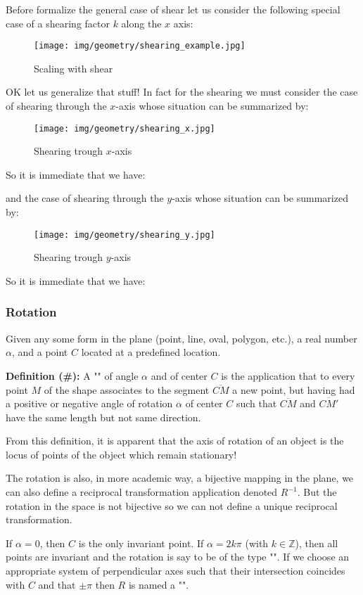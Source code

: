 	Before formalize the general case of shear let us consider the following special case of a shearing factor $k$ along the $x$ axis:
	
	\begin{figure}[H]
		\centering
		\texttt{[image: img/geometry/shearing\_example.jpg]}
		\caption{Scaling with shear}
	\end{figure}
	OK let us generalize that stuff! In fact for the shearing we must consider the case of shearing through the $x$-axis whose situation can be summarized by:
	\begin{figure}[H]
		\centering
		\texttt{[image: img/geometry/shearing\_x.jpg]}
		\caption{Shearing trough $x$-axis}
	\end{figure}
	So it is immediate that we have:
	
	and the case of shearing through the $y$-axis whose situation can be summarized by:
	\begin{figure}[H]
		\centering
		\texttt{[image: img/geometry/shearing\_y.jpg]}
		\caption{Shearing trough $y$-axis}
	\end{figure}
	So it is immediate that we have:
	
	
	\pagebreak
	\subsubsection{Rotation}\label{rotation}
	Given any some form in the plane (point, line, oval, polygon, etc.), a real number $\alpha$, and a point $C$ located at a predefined location.

	\textbf{Definition (\#\mydef):} A "" of angle $\alpha$ and of center $C$ is the application that to every point $M$ of the shape associates to the segment $\overline{CM}$ a new point, but having had a positive or negative angle of rotation $\alpha$ of center $C$ such that $\overline{CM}$ and $\overline{CM'}$ have the same length but not same direction.
	
	From this definition, it is apparent that the axis of rotation of an object is the locus of points of the object which remain stationary!
	\begin{tcolorbox}[title=Remark,colframe=black,arc=10pt]
	The rotation is also, in more academic way, a bijective mapping in the plane, we can also define a reciprocal transformation application denoted $R^{-1}$. But the rotation in the space is not bijective so we can not define a unique reciprocal transformation.
	\end{tcolorbox}
	If $\alpha=0$, then $C$ is the only invariant point. If $\alpha=2k\pi$ (with $k\in\mathbb{Z}$), then all points are invariant and the rotation is say to be of the type "". If we choose an appropriate system of perpendicular axes such that their intersection coincides with $C$ and that $\pm \pi$ then $R$ is named a "".

